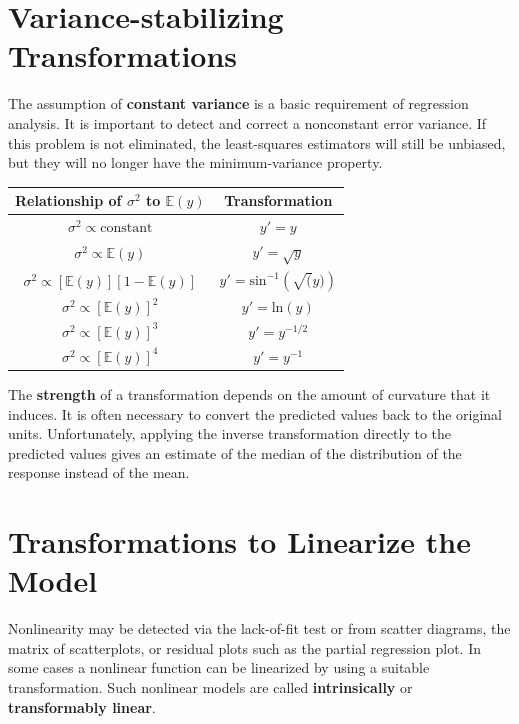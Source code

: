 \documentclass[12pt]{article}
\begin{document}
\section{Variance-stabilizing Transformations}

The assumption of \textbf{constant variance} is a basic requirement of regression analysis. It is important to detect and correct a nonconstant error variance. If this problem is not eliminated, the least-squares estimators will still be unbiased, but they will no longer have the minimum-variance property. 


\begin{table}[h!]
\begin{center}
\begin{tabular}{|c|c|}
\hline Relationship of $\sigma^2$ to $\mathbb{E}(y)$ & Transformation \\\hline
  $\sigma^2 \propto \mathrm{constant}$ & $y' = y$  \\
  $\sigma^2 \propto \mathbb{E}(y)$ & $y' = \sqrt{y}$  \\
  $\sigma^2 \propto [\mathbb{E}(y)][1-\mathbb{E}(y)]$ & $y' = \mathrm{sin}^{-1} \left( \sqrt(y)  \right)$  \\
  $\sigma^2 \propto [\mathbb{E}(y)]^2$ & $y' = \mathrm{ln} (y)$  \\
  $\sigma^2 \propto [\mathbb{E}(y)]^3$ & $y' = y^{-1/2}$  \\
  $\sigma^2 \propto [\mathbb{E}(y)]^4$ & $y' = y^{-1}$  \\\hline
\end{tabular}
\end{center}
\end{table}

The \textbf{strength} of a transformation depends on the amount of curvature that it induces. It is often necessary to convert the predicted values back to the original units. Unfortunately, applying the inverse transformation directly to the predicted values gives an estimate of the median of the distribution of the response instead of the mean.

\section{Transformations to Linearize the Model}

Nonlinearity may be detected via the lack-of-fit test or from scatter diagrams, the matrix of scatterplots, or residual plots such as the partial regression plot. In some cases a nonlinear function can be linearized by using a suitable transformation. Such nonlinear models are called \textbf{intrinsically} or \textbf{transformably linear}. 
\end{document}
